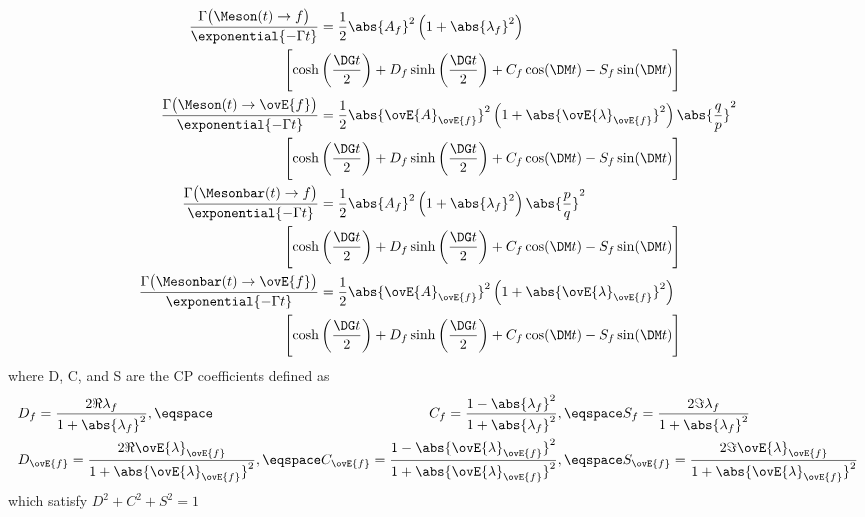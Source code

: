 \begin{equation}
  \begin{split}
    \frac{\Gamma \bigl(\Meson   (t) \to       f \bigr)}{\exponential{-\Gamma t}} &= 
      \frac{1}{2} \abs{A_f}^2 \left( 1 + \abs{\lambda_f}^2 \right) \\
        \Biggl[ \cosh&\left(\frac{\DG t}{2}\right) + D_f \sinh\left(\frac{\DG t}{2}\right) + C_f \cos(\DM t) - S_f \sin(\DM t) \Biggr] \\
    \frac{\Gamma \bigl(\Meson   (t) \to \ovE{f} \bigr)}{\exponential{-\Gamma t}} &= 
      \frac{1}{2} \abs{\ovE{A}_{\ovE{f}}}^2 \left( 1 + \abs{\ovE{\lambda}_{\ovE{f}}}^2 \right) \abs{\frac{q}{p}}^2 \\
        \Biggl[ \cosh&\left(\frac{\DG t}{2}\right) + D_f \sinh\left(\frac{\DG t}{2}\right) + C_f \cos(\DM t) - S_f \sin(\DM t) \Biggr] \\
    \frac{\Gamma \bigl(\Mesonbar(t) \to       f \bigr)}{\exponential{-\Gamma t}} &= 
      \frac{1}{2} \abs{A_f}^2 \left( 1 + \abs{\lambda_f}^2 \right) \abs{\frac{p}{q}}^2 \\
        \Biggl[ \cosh&\left(\frac{\DG t}{2}\right) + D_f \sinh\left(\frac{\DG t}{2}\right) + C_f \cos(\DM t) - S_f \sin(\DM t) \Biggr] \\
    \frac{\Gamma \bigl(\Mesonbar(t) \to \ovE{f} \bigr)}{\exponential{-\Gamma t}} &= 
      \frac{1}{2} \abs{\ovE{A}_{\ovE{f}}}^2 \left( 1 + \abs{\ovE{\lambda}_{\ovE{f}}}^2 \right) \\
        \Biggl[ \cosh&\left(\frac{\DG t}{2}\right) + D_f \sinh\left(\frac{\DG t}{2}\right) + C_f \cos(\DM t) - S_f \sin(\DM t) \Biggr] \\
  \end{split}
\end{equation}
%
where D, C, and S are the CP coefficients defined as
%
\begin{equation}
  \begin{alignedat}{2}
    &D_f = \frac{2 \Re \lambda_f}{1+\abs{\lambda_f}^2}, \eqspace 
    &C_f = \frac{1 - \abs{\lambda_f}^2}{1 + \abs{\lambda_f}^2}, \eqspace 
    &S_f = \frac{2 \Im \lambda_f}{1+\abs{\lambda_f}^2} \\
    &D_{\ovE{f}} = \frac{2 \Re \ovE{\lambda}_{\ovE{f}}}{1+\abs{\ovE{\lambda}_{\ovE{f}}}^2}, \eqspace 
    &C_{\ovE{f}} = \frac{1 - \abs{\ovE{\lambda}_{\ovE{f}}}^2}{1 + \abs{\ovE{\lambda}_{\ovE{f}}}^2}, \eqspace 
    &S_{\ovE{f}} = \frac{2 \Im \ovE{\lambda}_{\ovE{f}}}{1+\abs{\ovE{\lambda}_{\ovE{f}}}^2} \\
  \end{alignedat}
\end{equation}
%
which satisfy $D^2+C^2+S^2 = 1$

